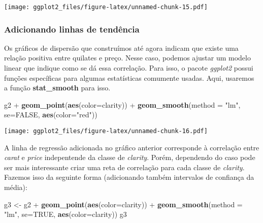 \documentclass[]{article}
\newenvironment{Shaded}{\begin{snugshade}}{\end{snugshade}}
\newcommand{\KeywordTok}[1]{\textcolor[rgb]{0.13,0.29,0.53}{\textbf{{#1}}}}
\newcommand{\DataTypeTok}[1]{\textcolor[rgb]{0.13,0.29,0.53}{{#1}}}
\newcommand{\StringTok}[1]{\textcolor[rgb]{0.31,0.60,0.02}{{#1}}}
\newcommand{\OtherTok}[1]{\textcolor[rgb]{0.56,0.35,0.01}{{#1}}}
\newcommand{\NormalTok}[1]{{#1}}
\begin{document}
\texttt{[image: ggplot2\_files/figure-latex/unnamed-chunk-15.pdf]}

\subsubsection{Adicionando linhas de
tendência}\label{adicionando-linhas-de-tendencia}

Os gráficos de dispersão que construímos até agora indicam que existe
uma relação positiva entre quilates e preço. Nesse caso, podemos ajustar
um modelo linear que indique como se dá essa correlação. Para isso, o
pacote \emph{ggplot2} possui funções específicas para algumas
estatísticas comumente usadas. Aqui, usaremos a função
\textbf{stat\_smooth} para isso.

\begin{Shaded}
\begin{Highlighting}[]
\NormalTok{g2 +}\StringTok{ }\KeywordTok{geom_point}\NormalTok{(}\KeywordTok{aes}\NormalTok{(}\DataTypeTok{color=}\NormalTok{clarity)) +}\StringTok{ }\KeywordTok{geom_smooth}\NormalTok{(}\DataTypeTok{method =} \StringTok{"lm"}\NormalTok{, }\DataTypeTok{se=}\OtherTok{FALSE}\NormalTok{, }\KeywordTok{aes}\NormalTok{(}\DataTypeTok{color=}\StringTok{"red"}\NormalTok{))}
\end{Highlighting}
\end{Shaded}

\texttt{[image: ggplot2\_files/figure-latex/unnamed-chunk-16.pdf]}

A linha de regressão adicionada no gráfico anterior corresponde à
correlação entre \emph{carat} e \emph{price} indepentende da classe de
\emph{clarity}. Porém, dependendo do caso pode ser mais interessante
criar uma reta de correlação para cada classe de \emph{clarity}. Fazemos
isso da seguinte forma (adicionando também intervalos de confiança da
média):

\begin{Shaded}
\begin{Highlighting}[]
\NormalTok{g3 <-}\StringTok{ }\NormalTok{g2 +}\StringTok{ }\KeywordTok{geom_point}\NormalTok{(}\KeywordTok{aes}\NormalTok{(}\DataTypeTok{color=}\NormalTok{clarity)) +}\StringTok{ }\KeywordTok{geom_smooth}\NormalTok{(}\DataTypeTok{method =} \StringTok{"lm"}\NormalTok{, }\DataTypeTok{se=}\OtherTok{TRUE}\NormalTok{, }\KeywordTok{aes}\NormalTok{(}\DataTypeTok{color=}\NormalTok{clarity))}
\NormalTok{g3}
\end{Highlighting}
\end{Shaded}
\end{document}

